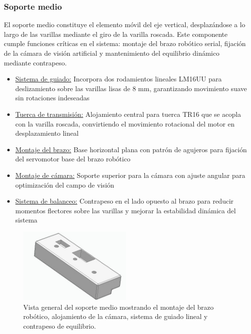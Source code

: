 \subsubsection{Soporte medio}

El soporte medio constituye el elemento móvil del eje vertical, desplazándose a lo largo de las varillas mediante el giro de la varilla roscada. Este componente cumple funciones críticas en el sistema: montaje del brazo robótico serial, fijación de la cámara de visión artificial y mantenimiento del equilibrio dinámico mediante contrapeso.

\begin{itemize}[label=$\bullet$]
    \item \underline{Sistema de guiado:} Incorpora dos rodamientos lineales LM16UU para deslizamiento sobre las varillas lisas de 8 mm, garantizando movimiento suave sin rotaciones indeseadas
    \item \underline{Tuerca de transmisión:} Alojamiento central para tuerca TR16 que se acopla con la varilla roscada, convirtiendo el movimiento rotacional del motor en desplazamiento lineal
    \item \underline{Montaje del brazo:} Base horizontal plana con patrón de agujeros para fijación del servomotor base del brazo robótico
    \item \underline{Montaje de cámara:} Soporte superior para la cámara con ajuste angular para optimización del campo de visión
    \item \underline{Sistema de balanceo:} Contrapeso en el lado opuesto al brazo para reducir momentos flectores sobre las varillas y mejorar la estabilidad dinámica del sistema
\end{itemize}

\begin{figure}[H]
    \centering
    \includegraphics[width=0.5\textwidth]{img/MedioReal_simplificado_vista.jpg}
    \caption{Vista general del soporte medio mostrando el montaje del brazo robótico, alojamiento de la cámara, sistema de guiado lineal y contrapeso de equilibrio.}
    \label{fig:soporte_medio_Real}
\end{figure}


